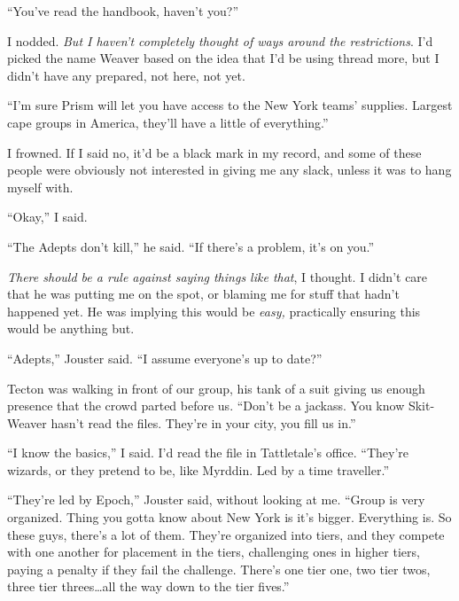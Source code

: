 ``You've read the handbook, haven't you?''



I nodded.  \emph{But I haven't completely thought of ways around the restrictions}.  I'd picked the name Weaver based on the idea that I'd be using thread more, but I didn't have any prepared, not here, not yet.



``I'm sure Prism will let you have access to the New York teams' supplies.  Largest cape groups in America, they'll have a little of everything.''



I frowned.  If I said no, it'd be a black mark in my record, and some of these people were obviously not interested in giving me any slack, unless it was to hang myself with.



``Okay,'' I said.



``The Adepts don't kill,'' he said.  ``If there's a problem, it's on you.''



\emph{There should be a rule against saying things like that}, I thought.  I didn't care that he was putting me on the spot, or blaming me for stuff that hadn't happened yet.  He was implying this would be \emph{easy, }practically ensuring this would be anything but.



\blacksquare



``Adepts,'' Jouster said.  ``I assume everyone's up to date?''



Tecton was walking in front of our group, his tank of a suit giving us enough presence that the crowd parted before us.  ``Don't be a jackass.  You know Skit- Weaver hasn't read the files.  They're in your city, you fill us in.''



``I know the basics,'' I said.  I'd read the file in Tattletale's office.  ``They're wizards, or they pretend to be, like Myrddin.  Led by a time traveller.''



``They're led by Epoch,'' Jouster said, without looking at me.  ``Group is very organized.  Thing you gotta know about New York is it's bigger.  Everything is.  So these guys, there's a lot of them.  They're organized into tiers, and they compete with one another for placement in the tiers, challenging ones in higher tiers, paying a penalty if they fail the challenge.  There's one tier one, two tier twos, three tier threes\ldots all the way down to the tier fives.''



